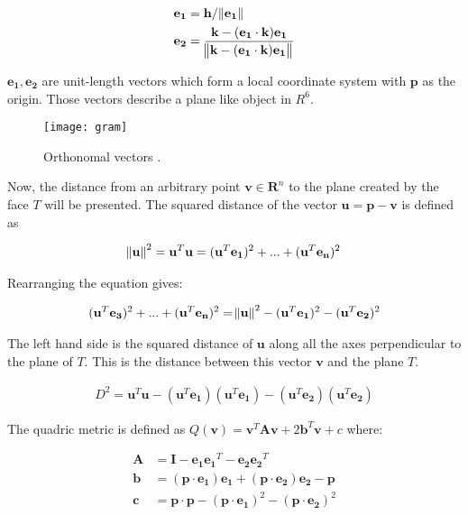 \begin{align}
\mathbf{e_1} &= \mathbf{h} / \norm{\mathbf{e_1}} \\
\mathbf{e_2} &= \frac{\mathbf{k} - (\mathbf{e_1} \cdot \mathbf{k})\mathbf{e_1}}{\norm{\mathbf{k} - (\mathbf{e_1} \cdot \mathbf{k})\mathbf{e_1}}}
\end{align}

$\mathbf{e_1}, \mathbf{e_2}$ are unit-length vectors which form a local coordinate system with $\mathbf{p}$ as the origin. Those vectors describe a plane like object in $R^6$.

\begin{figure}[H]
  \begin{center}
    \texttt{[image: gram]}
    \caption{Orthonomal vectors \cite{garland99}.}
    \label{fig:gram}
  \end{center}
\end{figure}

Now, the distance from an arbitrary point $\mathbf{v}\in\mathbf{R}^n$ to the plane created by the face $T$ will be presented. The squared distance of the vector $\mathbf{u} = \mathbf{p} - \mathbf{v}$ is defined as \cite{garland99}

\begin{align}
\norm{\mathbf{u}}^2 = \mathbf{u}^T\mathbf{u} = (\mathbf{u}^T\mathbf{e_1})^2 + ... +  (\mathbf{u}^T\mathbf{e_n})^2
\end{align}

Rearranging the equation gives:

\begin{align}
(\mathbf{u}^T\mathbf{e_3})^2 + ... +  (\mathbf{u}^T\mathbf{e_n})^2 = \norm{\mathbf{u}}^2 - (\mathbf{u}^T\mathbf{e_1})^2 - (\mathbf{u}^T\mathbf{e_2})^2
\end{align}

The left hand side is the squared distance of $\mathbf{u}$ along all the axes perpendicular to the plane of $T$. This is the distance between this vector $\mathbf{v}$ and the plane $T$.

\begin{align}
D^2 = \mathbf{u}^T\mathbf{u} - (\mathbf{u}^T\mathbf{e_1})(\mathbf{u}^T\mathbf{e_1}) - (\mathbf{u}^T\mathbf{e_2})(\mathbf{u}^T\mathbf{e_2})
\end{align}

The quadric metric is defined as $Q(\mathbf{v}) = \mathbf{v}^T\mathbf{A}\mathbf{v} + 2\mathbf{b}^T\mathbf{v} + c$ where:

\begin{align}
\mathbf{A} &= \mathbf{I} - \mathbf{e_1}\mathbf{e_1}^T - \mathbf{e_2}\mathbf{e_2}^T\\
\mathbf{b} &= (\mathbf{p} \cdot \mathbf{e_1})\mathbf{e_1} + (\mathbf{p} \cdot \mathbf{e_2})\mathbf{e_2} - \mathbf{p}\\ 
\mathbf{c} &= \mathbf{p} \cdot \mathbf{p} - (\mathbf{p} \cdot \mathbf{e_1})^2 - (\mathbf{p} \cdot \mathbf{e_2})^2 
\end{align}

